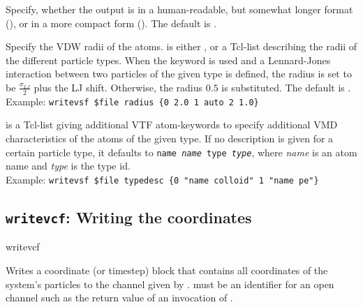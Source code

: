 \begin{arguments}
\item[\opt{\alt{short \asep verbose}}]
  Specify, whether the output is in a human-readable, but somewhat
  longer format (), or in a more compact form
  (). The default is .
  
\item[\opt{radius \alt{\var{radii} \asep auto}}] 
  Specify the VDW radii of the atoms.  is either
  , or a Tcl-list describing the radii of the different
  particle types. When the keyword  is used and a
  Lennard-Jones interaction between two particles of the given type is
  defined, the radius is set to be $\frac{\sigma_{LJ}}{2}$ plus the LJ
  shift.  Otherwise, the radius $0.5$ is substituted. The default is
  .\\
  Example: \verb!writevsf $file radius {0 2.0 1 auto 2 1.0}!
\item[\opt{typedesc \var{typedesc}}]
   is a Tcl-list giving additional VTF atom-keywords to
  specify additional VMD characteristics of the atoms of the given type.
  If no description is given for a certain particle type, it defaults to
  \texttt{name \textit{name} type \textit{type}}, where \textit{name}
  is an atom name and \textit{type} is the type id.\\
  Example: \verb!writevsf $file typedesc {0 "name colloid" 1 "name pe"}!
\end{arguments}

\subsection{\texttt{writevcf}: Writing  the coordinates}

\begin{essyntax}
  writevcf  
\end{essyntax}
Writes a coordinate (or timestep) block that contains all coordinates
of the system's particles to the channel given by .
 must be an identifier for an open channel such as the
return value of an invocation of .


